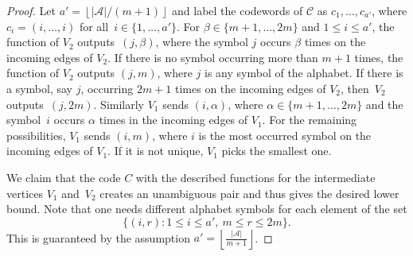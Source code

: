 \documentclass[11pt,a4paper]{article}
\theoremstyle{definition}
\newcommand{\mC}{\mathcal{C}}
\newcommand{\mA}{\mathcal{A}}
\begin{document}
\begin{proof}
Let $a' = \left\lfloor |\mA|/ (m+1)\right\rfloor$ and label the codewords of $\mC$ as $c_1,\ldots,c_{a'}$, where $c_i = (i,\ldots,i)$ for all~$i \in \{1,\ldots,a'\}$. 
For $\beta \in \{m+1,\ldots,2m\}$ and $1 \le i \le a'$, the function of $V_2$ outputs~$(j,\beta)$, where the symbol $j$ occurs $\beta$ times on the incoming edges of $V_2$. If there is no symbol occurring more than $m+1$ times, the function of $V_2$ outputs $(j,m)$, where $j$ is any symbol of the alphabet. If there is a symbol, say $j$, occurring $2m+1$ times on the incoming edges of $V_2$, then~$V_2$ outputs~$(j,2m)$. Similarly $V_1$ sends $(i,\alpha)$, where $\alpha \in \{m+1,\ldots,2m\}$ and the symbol~$i$ occurs $\alpha$ times in the incoming edges of $V_1$. For the remaining possibilities, $V_1$ sends $(i,m)$, where $i$ is the most occurred symbol on the incoming edges of $V_1$. If it is not unique, $V_1$ picks the smallest one. 

We claim that the code $C$ with the described functions for the intermediate vertices $V_1$ and~$V_2$ creates an unambiguous pair and thus gives the desired lower bound.
Note that one needs different alphabet symbols for each element of the set $$\{(i,r): 1\le i \le a',\ m \le r \le 2m\}.$$ This is guaranteed by the assumption $a' = \left\lfloor \frac{|\mA|}{m+1}\right\rfloor$.


\end{proof}
\end{document}
